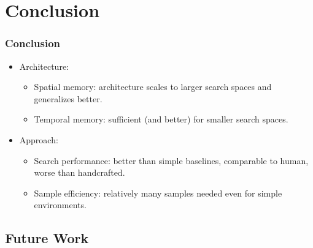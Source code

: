 \section{Conclusion}

\begin{frame}
    \frametitle{Conclusion}

    \begin{itemize}
        \item Architecture:
        \begin{itemize}
            \item Spatial memory: architecture scales to larger search spaces and generalizes better.
            \item Temporal memory: sufficient (and better) for smaller search spaces.
        \end{itemize}
        \item Approach:
        \begin{itemize}
            \item Search performance: better than simple baselines, comparable to human, worse than handcrafted.
            \item Sample efficiency: relatively many samples needed even for simple environments.
        \end{itemize}
    \end{itemize}
\end{frame}

\subsection{Future Work}

